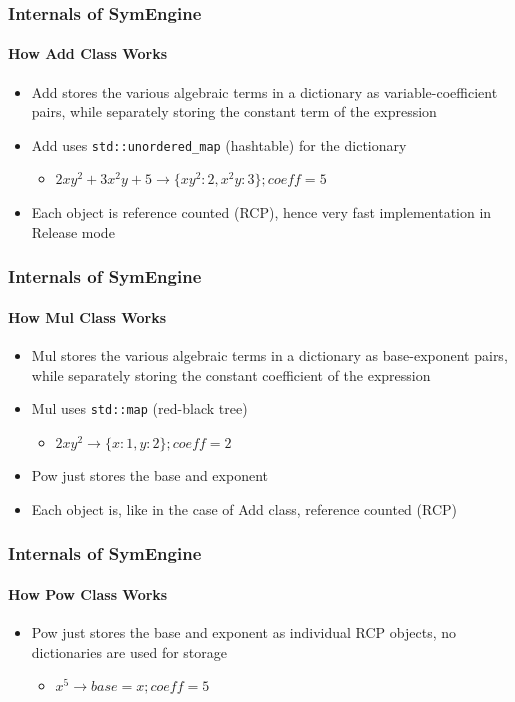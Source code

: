 \documentclass{beamer}
\begin{document}
\begin{frame}
\frametitle{Internals of SymEngine}
\framesubtitle{How Add Class Works}
\begin{itemize}
    \item Add stores the various algebraic terms in a dictionary as variable-coefficient 
        pairs, while separately storing the constant term of the expression
    \item Add uses \texttt{std::unordered\_map} (hashtable) for the dictionary
        \begin{itemize}
            \item $2xy^2+3x^2y + 5\to \{xy^2: 2, x^2y: 3\}; coeff=5 $
        \end{itemize}
    \item Each object is reference counted (RCP), hence very fast implementation in
        Release mode
\end{itemize}
\end{frame}


\begin{frame}
\frametitle{Internals of SymEngine}
\framesubtitle{How Mul Class Works}
\begin{itemize}
    \item Mul stores the various algebraic terms in a dictionary as base-exponent 
        pairs, while separately storing the constant coefficient of the expression
    \item Mul uses \texttt{std::map} (red-black tree)
        \begin{itemize}
            \item $2 xy^2 \to \{x: 1, y:2\}; coeff=2$
        \end{itemize}
    \item Pow just stores the base and exponent
    \item Each object is, like in the case of Add class, reference counted (RCP)
\end{itemize}
\end{frame}


\begin{frame}
\frametitle{Internals of SymEngine}
\framesubtitle{How Pow Class Works}
\begin{itemize}
    \item Pow just stores the base and exponent as individual RCP objects, no dictionaries are used for storage
        \begin{itemize}
            \item $ x^5 \to base=x; coeff=5$
        \end{itemize} 
\end{itemize}
\end{frame}
\end{document}

